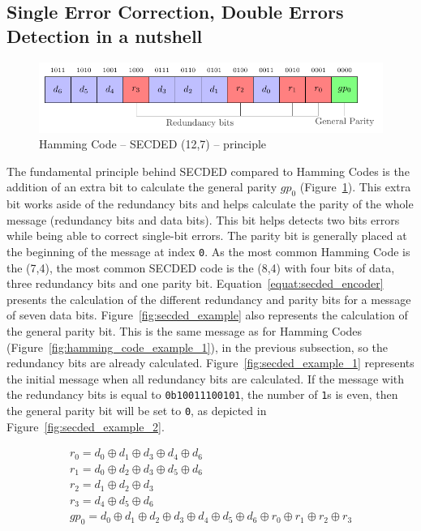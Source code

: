\subsection{Single Error Correction, Double Errors Detection in a nutshell}

\begin{figure}[ht]
    \centering
    \includegraphics[page=1]{c5_countermeasures_dift/img/secded.pdf}
    \caption{Hamming Code -- SECDED (12,7) -- principle}
    \label{fig:secded_functionning}
\end{figure}

The fundamental principle behind SECDED compared to Hamming Codes is the addition of an extra bit to calculate the general parity $gp_0$ (Figure~\ref{fig:secded_functionning}). This extra bit works aside of the redundancy bits and helps calculate the parity of the whole message (redundancy bits and data bits). This bit helps detects two bits errors while being able to correct single-bit errors. The parity bit is generally placed at the beginning of the message at index \texttt{0}. As the most common Hamming Code is the (7,4), the most common SECDED code is the (8,4) with four bits of data, three redundancy bits and one parity bit.
Equation~\ref{equat:secded_encoder} presents the calculation of the different redundancy and parity bits for a message of seven data bits.
Figure~\ref{fig:secded_example} also represents the calculation of the general parity bit. This is the same message as for Hamming Codes (Figure~\ref{fig:hamming_code_example_1}), in the previous subsection, so the redundancy bits are already calculated. Figure~\ref{fig:secded_example_1} represents the initial message when all redundancy bits are calculated. If the message with the redundancy bits is equal to \texttt{0b10011100101}, the number of \texttt{1}s is even, then the general parity bit will be set to \texttt{0}, as depicted in Figure~\ref{fig:secded_example_2}.

\begin{equation} \label{equat:secded_encoder}
    \begin{split}
        r_{0}   = d_{0} \oplus d_{1} \oplus d_{3} \oplus d_{4} \oplus d_{6} \\
        r_{1}   = d_{0} \oplus d_{2} \oplus d_{3} \oplus d_{5} \oplus d_{6} \\
        r_{2}   = d_{1} \oplus d_{2} \oplus d_{3} \\
        r_{3}   = d_{4} \oplus d_{5} \oplus d_{6} \\
        gp_{0}  = d_{0} \oplus d_{1} \oplus d_{2} \oplus d_{3} \oplus d_{4} \oplus d_{5} \oplus d_{6} \oplus r_{0} \oplus r_{1} \oplus r_{2} \oplus r_{3}
    \end{split}
\end{equation}

